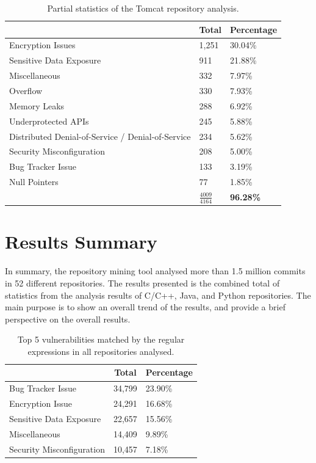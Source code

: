 \documentclass[12pt, a4paper]{report}
\begin{document}
\begin{table}[H]
  \centering
  \begin{tabular}{|l|l|l|}
    \hline \rowcolor[HTML]{D8D8D8}
    \multicolumn{1}{|c|}{Vulnerabilities} & \multicolumn{1}{|c|}{Total} &
    \multicolumn{1}{|c|}{Percentage} \\ \hline
    Encryption Issues & 1,251 & 30.04\% \\
    Sensitive Data Exposure & 911 & 21.88\% \\
    Miscellaneous & 332 & 7.97\% \\
    Overflow & 330 & 7.93\% \\
    Memory Leaks & 288 & 6.92\% \\
    Underprotected APIs & 245 & 5.88\% \\
    Distributed Denial-of-Service / Denial-of-Service & 234 & 5.62\% \\
    Security Misconfiguration & 208 & 5.00\% \\
    Bug Tracker Issue & 133 & 3.19\% \\
    Null Pointers & 77 & 1.85\% \\ \hline
    & \textbf{$\frac{4009}{4164}$} & \textbf{96.28\%} \\ \hline
  \end{tabular}
  \caption{Partial statistics of the Tomcat repository analysis.}
  \label{table:case_cpython}
\end{table}

\section{Results Summary}
In summary, the repository mining tool analysed more than 1.5 million commits in 52 different
repositories. The results presented is the combined total of statistics from the analysis results of
C/C++, Java, and Python repositories. The main purpose is to show an overall trend of the results,
and provide a brief perspective on the overall results.

\begin{table}[H]
  \centering
  \begin{tabular}{|l|l|l|}
    \hline \rowcolor[HTML]{D8D8D8}
    \multicolumn{1}{|c|}{Vulnerabilities} & \multicolumn{1}{|c|}{Total} &
    \multicolumn{1}{|c|}{Percentage} \\ \hline
    Bug Tracker Issue & 34,799 & 23.90\% \\
    Encryption Issue & 24,291 & 16.68\% \\
    Sensitive Data Exposure & 22,657 & 15.56\% \\
    Miscellaneous & 14,409 & 9.89\% \\
    Security Misconfiguration & 10,457 & 7.18\% \\ \hline
  \end{tabular}
  \caption{Top 5 vulnerabilities matched by the regular expressions in all repositories analysed.}
  \label{table:top5_all}
\end{table}
\end{document}
